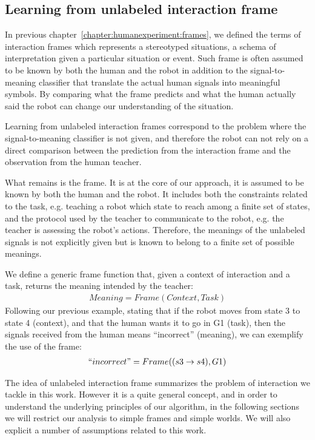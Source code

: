 \subsection{Learning from unlabeled interaction frame}

In previous chapter~\ref{chapter:humanexperiment:frames}, we defined the terms of interaction frames which represents a stereotyped situations, a schema of interpretation given a particular situation or event. Such frame is often assumed to be known by both the human and the robot in addition to the signal-to-meaning classifier that translate the actual human signals into meaningful symbols. By comparing what the frame predicts and what the human actually said the robot can change our understanding of the situation.

Learning from unlabeled interaction frames correspond to the problem where the signal-to-meaning classifier is not given, and therefore the robot can not rely on a direct comparison between the prediction from the interaction frame and the observation from the human teacher. 

What remains is the frame. It is at the core of our approach, it is assumed to be known by both the human and the robot. It includes both the constraints related to the task, e.g. teaching a robot which state to reach among a finite set of states, and the protocol used by the teacher to communicate to the robot, e.g. the teacher is assessing the robot's actions. Therefore, the meanings of the unlabeled signals is not explicitly given but is known to belong to a finite set of possible meanings.

We define a generic frame function that, given a context of interaction and a task, returns the meaning intended by the teacher:
%
\begin{eqnarray}
Meaning = Frame(Context, Task)
\end{eqnarray}
%
Following our previous example, stating that if the robot moves from state 3 to state 4 (context), and that the human wants it to go in G1 (task), then the signals received from the human means ``incorrect'' (meaning), we can exemplify the use of the frame:
%
\begin{eqnarray}
``incorrect" = Frame((s3 \rightarrow s4), G1)
\end{eqnarray}

\transition

The idea of unlabeled interaction frame summarizes the problem of interaction we tackle in this work. However it is a quite general concept, and in order to understand the underlying principles of our algorithm, in the following sections we will restrict our analysis to simple frames and simple worlds. We will also explicit a number of assumptions related to this work.

